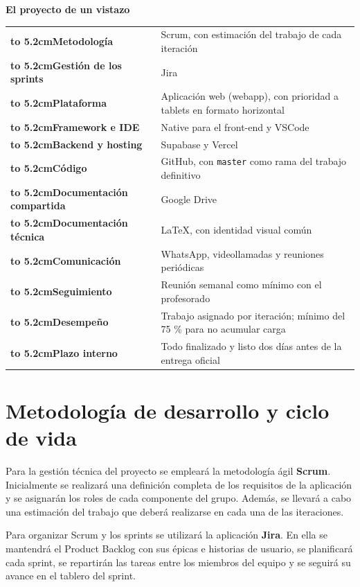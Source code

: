 \documentclass[11pt,a4paper]{article}
\newcommand{\key}[1]{\textbf{\color{brandblue}#1}}
\begin{document}
\vspace{0.6em}
{\large\bfseries\color{brandgreen}El proyecto de un vistazo}\par
\vspace{0.2em}
{\setlength{\parskip}{0pt}\renewcommand{\arraystretch}{1.6}
\begin{tabular}{@{\hspace{6pt}}>{\bfseries\color{brandblue}\hbox to 5.2cm\bgroup}l<{\hfil\egroup}p{9.8cm}@{}}
Metodología & Scrum, con estimación del trabajo de cada iteración \\
Gestión de los sprints & Jira \\
Plataforma & Aplicación web (webapp), con prioridad a tablets en formato horizontal \\
Framework e IDE & Native para el front-end y VSCode \\
Backend y hosting & Supabase y Vercel \\
Código & GitHub, con \texttt{master} como rama del trabajo definitivo \\
Documentación compartida & Google Drive \\
Documentación técnica & LaTeX, con identidad visual común \\
Comunicación & WhatsApp, videollamadas y reuniones periódicas \\
Seguimiento & Reunión semanal como mínimo con el profesorado \\
Desempeño & Trabajo asignado por iteración; mínimo del 75 \% para no acumular carga \\
Plazo interno & Todo finalizado y listo dos días antes de la entrega oficial \\
\end{tabular}}

\clearpage
\section{Metodología de desarrollo y ciclo de vida}
Para la gestión técnica del proyecto se empleará la metodología ágil \key{Scrum}. Inicialmente se realizará una definición completa de los requisitos de la aplicación y se asignarán los roles de cada componente del grupo. Además, se llevará a cabo una estimación del trabajo que deberá realizarse en cada una de las iteraciones.

Para organizar Scrum y los sprints se utilizará la aplicación \key{Jira}. En ella se mantendrá el Product Backlog con sus épicas e historias de usuario, se planificará cada sprint, se repartirán las tareas entre los miembros del equipo y se seguirá su avance en el tablero del sprint.
\end{document}
